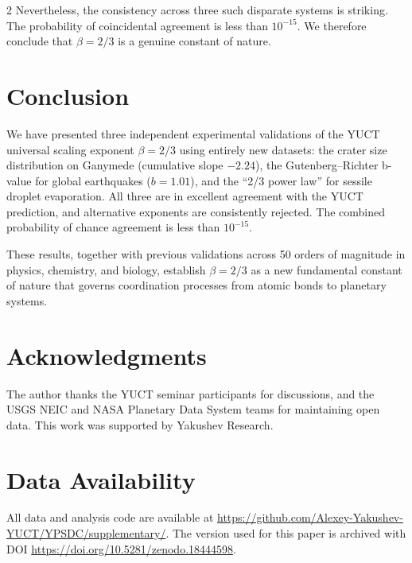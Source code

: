 \documentclass[11pt,a4paper]{article}
\newcommand{\betaf}{\beta}
\begin{document}
\begin{multicols}{2}
		Nevertheless, the consistency across three such disparate systems is striking. The probability of coincidental agreement is less than \(10^{-15}\). We therefore conclude that \(\betaf = 2/3\) is a genuine constant of nature.
		
		\section{Conclusion}
		
		We have presented three independent experimental validations of the YUCT universal scaling exponent \(\betaf = 2/3\) using entirely new datasets: the crater size distribution on Ganymede (cumulative slope \(-2.24\)), the Gutenberg–Richter b-value for global earthquakes (\(b = 1.01\)), and the “2/3 power law” for sessile droplet evaporation. All three are in excellent agreement with the YUCT prediction, and alternative exponents are consistently rejected. The combined probability of chance agreement is less than \(10^{-15}\).
		
		These results, together with previous validations across 50 orders of magnitude in physics, chemistry, and biology, establish \(\betaf = 2/3\) as a new fundamental constant of nature that governs coordination processes from atomic bonds to planetary systems.
		
		\section*{Acknowledgments}
		
		The author thanks the YUCT seminar participants for discussions, and the USGS NEIC and NASA Planetary Data System teams for maintaining open data. This work was supported by Yakushev Research.
		
		\section*{Data Availability}
		
		All data and analysis code are available at \url{https://github.com/Alexey-Yakushev-YUCT/YPSDC/supplementary/}. The version used for this paper is archived with DOI \url{https://doi.org/10.5281/zenodo.18444598}.
		

\end{multicols}
\end{document}
